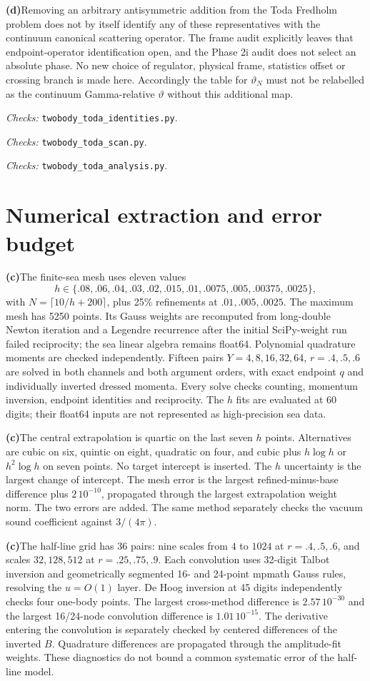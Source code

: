 \documentclass[11pt,a4paper]{article}
\newcommand{\C}{\textbf{(c)}\nobreakspace}
\newcommand{\D}{\textbf{(d)}\nobreakspace}
\newcommand{\file}[1]{\nolinkurl{#1}}
\newcommand{\checks}[1]{\par\noindent\textit{Checks:} \file{twobody_toda_#1.py}.\par}
\begin{document}
\D Removing an arbitrary antisymmetric addition from the Toda Fredholm
problem does not by itself identify any of these representatives with the
continuum canonical scattering operator. The frame audit explicitly leaves
that endpoint-operator identification open, and the Phase 2i audit does not
select an absolute phase. No new choice of regulator, physical frame,
statistics offset or crossing branch is made here. Accordingly the table
for $\vartheta_N$ must not be relabelled as the continuum Gamma-relative
$\vartheta$ without this additional map.
\checks{identities}\checks{scan}\checks{analysis}

\section{Numerical extraction and error budget}
\C The finite-sea mesh uses eleven values
\[
h\in\{.08,.06,.04,.03,.02,.015,.01,.0075,.005,.00375,.0025\},
\]
with $N=\lceil10/h+200\rceil$, plus 25\% refinements at $.01,.005,.0025$.
The maximum mesh has 5250 points. Its Gauss weights are recomputed from
long-double Newton iteration and a Legendre recurrence after the initial
SciPy-weight run failed reciprocity; the sea linear algebra remains float64.
Polynomial quadrature moments are checked independently. Fifteen pairs
$Y=4,8,16,32,64$, $r=.4,.5,.6$ are solved in both channels and both argument
orders, with exact endpoint $q$ and individually inverted dressed momenta.
Every solve checks counting, momentum inversion, endpoint identities and
reciprocity. The $h$ fits are evaluated at 60 digits; their float64 inputs
are not represented as high-precision sea data.

\C The central extrapolation is quartic on the last seven $h$ points.
Alternatives are cubic on six, quintic on eight, quadratic on four, and
cubic plus $h\log h$ or $h^2\log h$ on seven points. No target intercept
is inserted. The $h$ uncertainty is the largest change of intercept.
The mesh error is the largest refined-minus-base difference plus
$2\,10^{-10}$, propagated through the largest extrapolation weight norm.
The two errors are added. The same method separately checks the vacuum
sound coefficient against $3/(4\pi)$.

\C The half-line grid has 36 pairs: nine scales from $4$ to $1024$ at
$r=.4,.5,.6$, and scales $32,128,512$ at $r=.25,.75,.9$.
Each convolution uses 32-digit Talbot inversion and geometrically segmented
16- and 24-point mpmath Gauss rules, resolving the $u=O(1)$ layer.
De Hoog inversion at 45 digits independently checks four one-body points.
The largest cross-method difference is $2.57\,10^{-30}$ and the largest
16/24-node convolution difference is $1.01\,10^{-15}$.
The derivative entering the convolution is separately checked by centered
differences of the inverted $B$. Quadrature differences are propagated
through the amplitude-fit weights. These diagnostics do not bound a common
systematic error of the half-line model.
\end{document}
